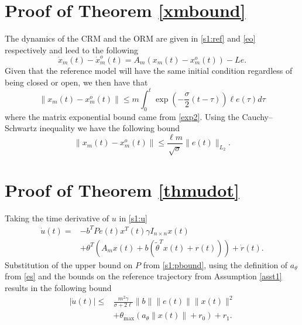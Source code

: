 \documentclass[10pt,journal]{IEEEtran}
\theoremstyle{plain}%
\theoremstyle{definition}
\newcommand{\be}[0]{\begin{equation}}
\newcommand{\ee}[0]{\end{equation}}
\newcommand{\norms}[1]{\lVert#1\rVert}
\newcommand{\normB}[0]{\norms}
\let\norm=\normB
\newcommand{\abs}[1]{\left\lvert#1\right\rvert}
\newcommand{\norml}[2]{\norm{#1}_{L_{#2}}}
\renewcommand{\IEEEQED}{\IEEEQEDopen}
\begin{document}
\section{Proof of Theorem \ref{xmbound}}\label{xmboundp}
\begin{IEEEproof}
The dynamics of the CRM and the ORM are given in \eqref{s1:ref} and \eqref{eo} respectively and leed to the following
\be
\dot x_m(t) - \dot x_m^o(t) = A_m (x_m(t)-x_m^o(t)) - L e.
\ee
Given that the reference model will have the same initial condition regardless of being closed or open, we then have that 
\be
\norm{x_m(t)-x_m^o(t)}  \leq m \int_0^t\exp({-\frac{\sigma}{2}(t-\tau)}) \ell e(\tau) d\tau 
\ee
where the matrix exponential bound came from \eqref{exp2}. Using the Cauchy--Schwartz inequality we have the following bound
\be
\norm{x_m(t)-x_m^o(t)}  \leq \frac{\ell m}{\sqrt\sigma} \norml{e(t)}{2}.
\ee \let\IEEEQED\relax
\end{IEEEproof}

\section{Proof of Theorem \ref{thmudot}}\label{tan}
Taking the time derivative of $u$ in \eqref{s1:u}
\be \begin{split}
\dot u(t)=& - b^T P e(t) x^T(t)\gamma I_{n\times n} x(t)\\ &+ \theta^T\left(A_m x(t)  + b \left( \tilde\theta^T  x(t)+ r(t)\right)\right)+\dot r(t).
\end{split}\ee
Substitution of the upper bound on $P$ from \eqref{s1:pbound}, using the definition of $a_\theta$ from \eqref{es} and the bounds on the reference trajectory from Assumption \ref{asst1} results in the following bound
\be\begin{split}\label{s1:udotbound}
\abs{\dot u(t)} \leq &\frac{m^2\gamma}{\sigma+2\ell}\norm b \norm{e(t)} \norm{x(t)}^2  \\ & + \theta_\text{max}\left(a_\theta \norm {x(t)}+r_0\right) + r_1.
\end{split}\ee
\end{document}

